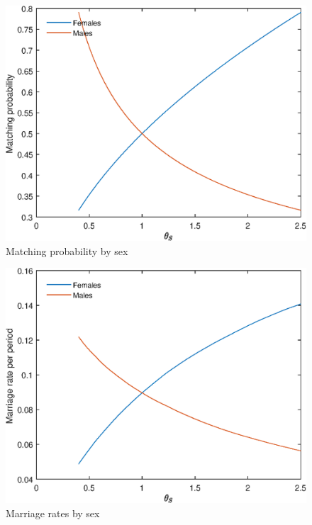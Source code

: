 \documentclass[12pt]{article}
\begin{document}
\begin{figure}
	\centering
	\caption{Matching probability by sex}
	\includegraphics{Graphs/match_prob_theta_S_ex1.eps}
\end{figure}

\begin{figure}
	\centering
	\caption{Marriage rates by sex}
	\includegraphics{Graphs/marr_rates_theta_S_ex1.eps}
\end{figure}
\end{document}
